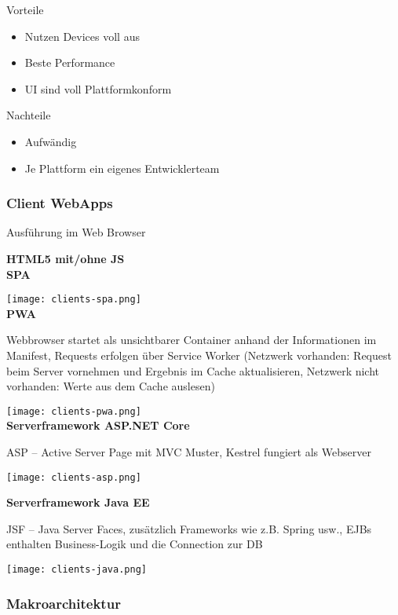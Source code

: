 Vorteile
\begin{itemize}
    \item Nutzen Devices voll aus
    \item Beste Performance
    \item UI sind voll Plattformkonform
\end{itemize}
\vspace{10pt}

Nachteile
\begin{itemize}
    \item Aufwändig
    \item Je Plattform ein eigenes Entwicklerteam
\end{itemize}

\subsubsection{Client WebApps}

Ausführung im Web Browser

\textbf{HTML5 mit/ohne JS} \\

\textbf{SPA}

\texttt{[image: clients-spa.png]} \\

\textbf{PWA}

Webbrowser startet als unsichtbarer Container anhand der Informationen im Manifest, Requests erfolgen über Service Worker (Netzwerk vorhanden: Request beim Server vornehmen und Ergebnis im Cache aktualisieren, Netzwerk nicht vorhanden: Werte aus dem Cache auslesen)

\texttt{[image: clients-pwa.png]} \\

\textbf{Serverframework ASP.NET Core}

ASP – Active Server Page mit MVC Muster, Kestrel fungiert als Webserver

\texttt{[image: clients-asp.png]} \\

\vfill\null
\columnbreak

\textbf{Serverframework Java EE}

JSF – Java Server Faces, zusätzlich Frameworks wie z.B. Spring usw., EJBs enthalten Business-Logik und die Connection zur DB

\texttt{[image: clients-java.png]}

\subsubsection{Makroarchitektur}

